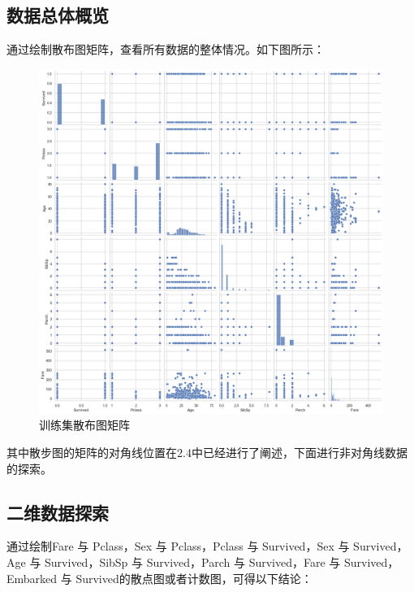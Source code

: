 	\subsection{数据总体概览}
	通过绘制散布图矩阵，查看所有数据的整体情况。如下图所示：
		\begin{figure}[H]
			\centering
			\includegraphics[scale=0.3,angle=0]{images/6.png}
			\caption{训练集散布图矩阵}
			\label{6}
		\end{figure}
其中散步图的矩阵的对角线位置在2.4中已经进行了阐述，下面进行非对角线数据的探索。
\subsection{二维数据探索}
	通过绘制Fare 与 Pclass，Sex 与 Pclass，Pclass 与 Survived，Sex 与 Survived，Age 与 Survived，SibSp 与 Survived，Parch 与 Survived，Fare 与 Survived，Embarked 与 Survived的散点图或者计数图，可得以下结论：

